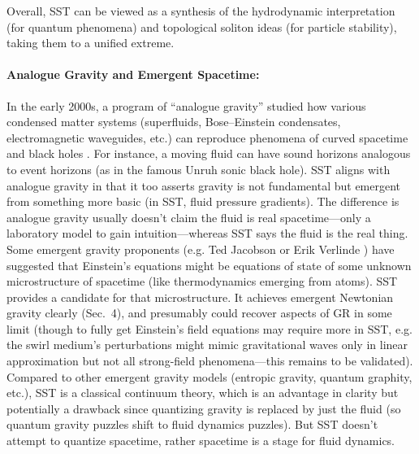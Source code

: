 \documentclass[10pt,reprint,aps,onecolumn,nofootinbib]{revtex4-2}
\begin{document}
Overall, SST can be viewed as a synthesis of the hydrodynamic interpretation (for quantum phenomena) and topological soliton ideas (for particle stability), taking them to a unified extreme.


\paragraph{Analogue Gravity and Emergent Spacetime:}

In the early 2000s, a program of “analogue gravity” studied how various condensed matter systems (superfluids, Bose–Einstein condensates, electromagnetic waveguides, etc.) can reproduce phenomena of curved spacetime and black holes \cite{Barcelo2011}. For instance, a moving fluid can have sound horizons analogous to event horizons (as in the famous Unruh sonic black hole). SST aligns with analogue gravity in that it too asserts gravity is not fundamental but emergent from something more basic (in SST, fluid pressure gradients). The difference is analogue gravity usually doesn’t claim the fluid is real spacetime—only a laboratory model to gain intuition—whereas SST says the fluid is the real thing. Some emergent gravity proponents (e.g. Ted Jacobson \cite{Jacobson1995} or Erik Verlinde \cite{Verlinde2011}) have suggested that Einstein’s equations might be equations of state of some unknown microstructure of spacetime (like thermodynamics emerging from atoms). SST provides a candidate for that microstructure. It achieves emergent Newtonian gravity clearly (Sec.~4), and presumably could recover aspects of GR in some limit (though to fully get Einstein’s field equations may require more in SST, e.g. the swirl medium’s perturbations might mimic gravitational waves only in linear approximation but not all strong-field phenomena—this remains to be validated). Compared to other emergent gravity models (entropic gravity, quantum graphity, etc.), SST is a classical continuum theory, which is an advantage in clarity but potentially a drawback since quantizing gravity is replaced by just the fluid (so quantum gravity puzzles shift to fluid dynamics puzzles). But SST doesn’t attempt to quantize spacetime, rather spacetime is a stage for fluid dynamics.
\end{document}
